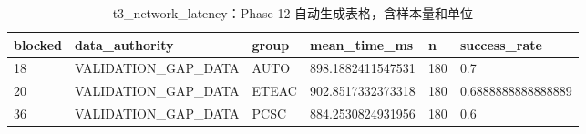 \begin{table}[htbp]
\centering
\caption{t3_network_latency：Phase 12 自动生成表格，含样本量和单位}
\begin{tabular}{llllll}
\hline
blocked & data_authority & group & mean_time_ms & n & success_rate \\
\hline
18 & VALIDATION\_GAP\_DATA & AUTO & 898.1882411547531 & 180 & 0.7 \\
20 & VALIDATION\_GAP\_DATA & ETEAC & 902.8517332373318 & 180 & 0.6888888888888889 \\
36 & VALIDATION\_GAP\_DATA & PCSC & 884.2530824931956 & 180 & 0.6 \\
\hline
\end{tabular}
\end{table}
